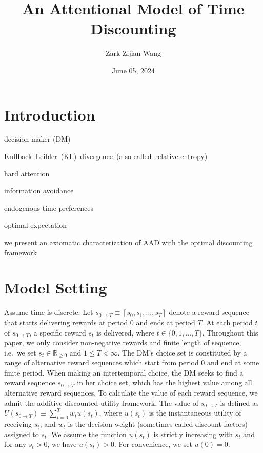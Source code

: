 \documentclass[
  12pt,
]{article}
\title{An Attentional Model of Time Discounting}
\author{Zark Zijian Wang}
\date{June 05, 2024}
\begin{document}
\maketitle

\hypertarget{introduction}{%
\section{Introduction}\label{introduction}}

decision maker (DM)

Kullback--Leibler~(KL)~divergence~(also called~relative entropy)

hard attention

information avoidance

endogenous time preferences

optimal expectation

we present an axiomatic characterization of AAD with the optimal
discounting framework

\hypertarget{model-setting}{%
\section{Model Setting}\label{model-setting}}

Assume time is discrete. Let
\(s_{0\rightarrow T}\equiv[s_0,s_1,...,s_T]\) denote a reward sequence
that starts delivering rewards at period 0 and ends at period \(T\). At
each period \(t\) of \(s_{0\rightarrow T}\), a specific reward \(s_t\)
is delivered, where \(t\in\{0,1,…,T\}\). Throughout this paper, we only
consider non-negative rewards and finite length of sequence, i.e.~we set
\(s_t \in \mathbb{R}_{\geq 0}\) and \(1\leq T<\infty\). The DM's choice
set is constituted by a range of alternative reward sequences which
start from period 0 and end at some finite period. When making an
intertemporal choice, the DM seeks to find a reward sequence
\(s_{0\rightarrow T}\) in her choice set, which has the highest value
among all alternative reward sequences. To calculate the value of each
reward sequence, we admit the additive discounted utility framework. The
value of \(s_{0\rightarrow T}\) is defined as
\(U(s_{0\rightarrow T})\equiv \sum_{t=0}^T w_{t}u(s_t)\), where
\(u(s_t)\) is the instantaneous utility of receiving \(s_t\), and
\(w_t\) is the decision weight (sometimes called discount factors)
assigned to \(s_t\). We assume the function \(u(s_t)\) is strictly
increasing with \(s_t\) and for any \(s_t>0\), we have \(u(s_t)>0\). For
convenience, we set \(u(0)=0\).
\end{document}
